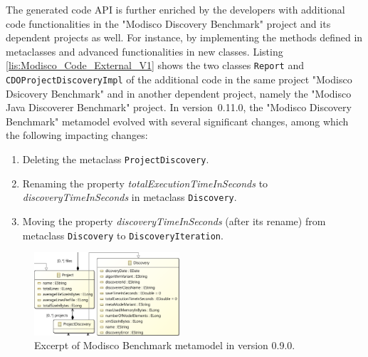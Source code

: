 The generated code API is further enriched by the developers with additional code functionalities in the "Modisco Discovery Benchmark" project and its dependent projects as well.
For instance, by implementing the methods defined in metaclasses and advanced functionalities in new classes. Listing \ref{lis:Modisco_Code_External_V1} shows the two classes \texttt{Report} and \texttt{CDOProjectDiscoveryImpl} of the additional code in the same project "Modisco Dsicovery Benchmark" and in another dependent project, namely the "Modisco Java Discoverer Benchmark" project. 
In version~0.11.0, the "Modisco Discovery Benchmark" metamodel evolved with several significant changes, among which the following impacting changes:

\begin{enumerate}%
	
	\item Deleting the metaclass \texttt{ProjectDiscovery}. 
	
	\item Renaming the property \emph{totalExecutionTimeInSeconds} to \emph{discoveryTimeInSeconds} in metaclass \texttt{Discovery}. 
	
	\item Moving the property \emph{discoveryTimeInSeconds} (after its rename) from metaclass \texttt{Discovery} to \texttt{DiscoveryIteration}. 
	
\end{enumerate} 


\begin{figure}
	
	\centering
	\includegraphics[width=0.48\textwidth]{pics/chapter1pics/example.PNG}
	\caption{Excerpt of Modisco Benchmark metamodel in version 0.9.0.}
	\label{fig: BMM}
	\vspace{-5mm}
\end{figure}

